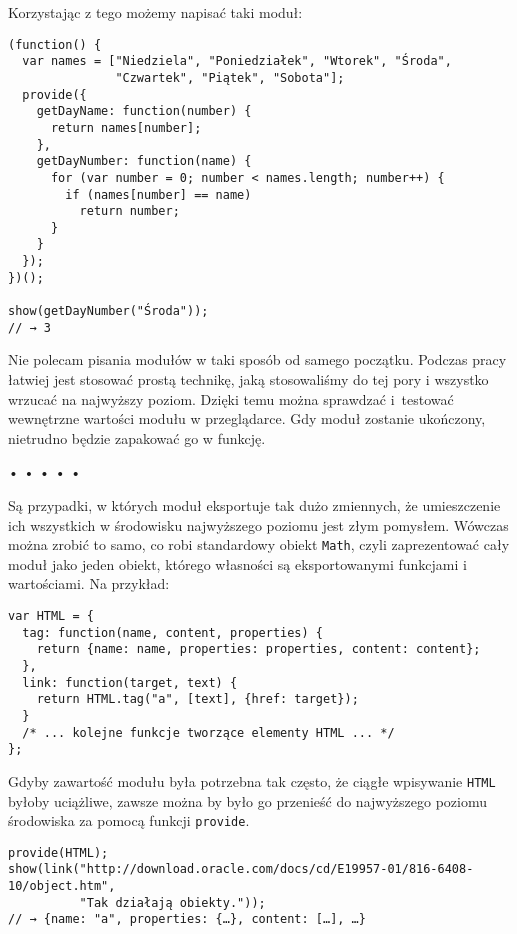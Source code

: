Korzystając z tego możemy napisać taki moduł:

  
\begin{verbatim} 
(function() {
  var names = ["Niedziela", "Poniedziałek", "Wtorek", "Środa",
               "Czwartek", "Piątek", "Sobota"];
  provide({
    getDayName: function(number) {
      return names[number];
    },
    getDayNumber: function(name) {
      for (var number = 0; number < names.length; number++) {
        if (names[number] == name)
          return number;
      }
    }
  });
})();

show(getDayNumber("Środa"));
// → 3
\end{verbatim}
  
Nie polecam pisania modułów w taki sposób od samego początku. Podczas pracy łatwiej jest stosować prostą technikę, jaką stosowaliśmy do tej pory i wszystko wrzucać na najwyższy poziom. Dzięki temu można sprawdzać i~testować wewnętrzne wartości modułu w przeglądarce. Gdy moduł zostanie ukończony, nietrudno będzie zapakować go w funkcję.



\begin{center}
• • • • •
\end{center}

  
Są przypadki, w których moduł eksportuje tak dużo zmiennych, że umieszczenie ich wszystkich w środowisku najwyższego poziomu jest złym pomysłem. Wówczas można zrobić to samo, co robi standardowy obiekt \texttt{Math}, czyli zaprezentować cały moduł jako jeden obiekt, którego własności są eksportowanymi funkcjami i wartościami. Na przykład:

  
\begin{verbatim} 
var HTML = {
  tag: function(name, content, properties) {
    return {name: name, properties: properties, content: content};
  },
  link: function(target, text) {
    return HTML.tag("a", [text], {href: target});
  }
  /* ... kolejne funkcje tworzące elementy HTML ... */
};
 \end{verbatim}
  
Gdyby zawartość modułu była potrzebna tak często, że ciągłe wpisywanie \texttt{HTML} byłoby uciążliwe, zawsze można by było go przenieść do najwyższego poziomu środowiska za pomocą funkcji \texttt{provide}.

  
\begin{verbatim} 
provide(HTML);
show(link("http://download.oracle.com/docs/cd/E19957-01/816-6408-10/object.htm",
          "Tak działają obiekty."));
// → {name: "a", properties: {…}, content: […], …}
\end{verbatim}
  
